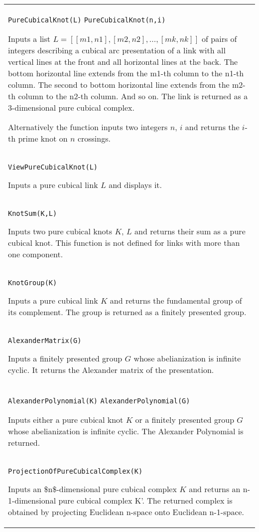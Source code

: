 \documentclass[a4paper,11pt]{report}
\begin{document}
{
 \begin{center}
\begin{tabular}{|l|} \index{PureCubicalKnot} \texttt{PureCubicalKnot(L)} \texttt{PureCubicalKnot(n,i)} 

 Inputs a list $L=[[m1,n1], [m2,n2], ..., [mk,nk]]$ of pairs of integers describing a cubical arc presentation of a link with all
vertical lines at the front and all horizontal lines at the back. The bottom
horizontal line extends from the m1-th column to the n1-th column. The second
to bottom horizontal line extends from the m2-th column to the n2-th column.
And so on. The link is returned as a 3-dimensional pure cubical complex. 

 Alternatively the function inputs two integers $n$, $i$ and returns the $i$-th prime knot on $n$ crossings. \\
 \index{ViewPureCubicalKnot} \texttt{ViewPureCubicalKnot(L)} 

 Inputs a pure cubical link $L$ and displays it. 

 \\
 \index{KnotSum} \texttt{KnotSum(K,L)} 

 Inputs two pure cubical knots $K$, $L$ and returns their sum as a pure cubical knot. This function is not defined for
links with more than one component. 

 \\
 \index{KnotGroup} \texttt{KnotGroup(K)} 

 Inputs a pure cubical link $K$ and returns the fundamental group of its complement. The group is returned as
a finitely presented group. 

 \\
 \index{AlexanderMatrix} \texttt{AlexanderMatrix(G)} 

 Inputs a finitely presented group $G$ whose abelianization is infinite cyclic. It returns the Alexander matrix of
the presentation. 

 \\
 \index{AlexanderPolynomial} \texttt{AlexanderPolynomial(K)} \texttt{AlexanderPolynomial(G)} 

 Inputs either a pure cubical knot $K$ or a finitely presented group $G$ whose abelianization is infinite cyclic. The Alexander Polynomial is returned. 

 \\
 \index{ProjectionOfPureCubicalComplex} \texttt{ProjectionOfPureCubicalComplex(K)} 

 Inputs an \$n\$-dimensional pure cubical complex $K$ and returns an n-1-dimensional pure cubical complex K'. The returned complex
is obtained by projecting Euclidean n-space onto Euclidean n-1-space. 


\end{tabular}
\end{center}}
\end{document}
